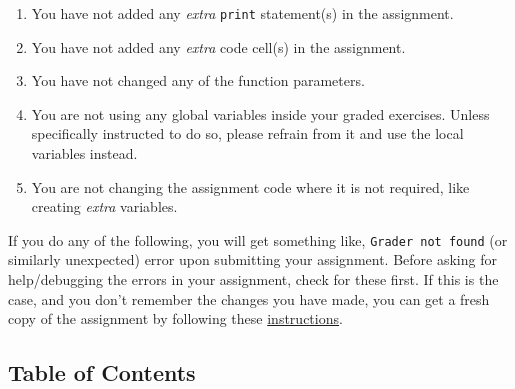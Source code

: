 \documentclass[11pt]{article}
\providecommand{\tightlist}{%
      \setlength{\itemsep}{0pt}\setlength{\parskip}{0pt}}
\begin{document}
\begin{enumerate}
\def\labelenumi{\arabic{enumi}.}
\tightlist
\item
  You have not added any \emph{extra} \texttt{print} statement(s) in the
  assignment.
\item
  You have not added any \emph{extra} code cell(s) in the assignment.
\item
  You have not changed any of the function parameters.
\item
  You are not using any global variables inside your graded exercises.
  Unless specifically instructed to do so, please refrain from it and
  use the local variables instead.
\item
  You are not changing the assignment code where it is not required,
  like creating \emph{extra} variables.
\end{enumerate}

If you do any of the following, you will get something like,
\texttt{Grader\ not\ found} (or similarly unexpected) error upon
submitting your assignment. Before asking for help/debugging the errors
in your assignment, check for these first. If this is the case, and you
don't remember the changes you have made, you can get a fresh copy of
the assignment by following these
\href{https://www.coursera.org/learn/deep-neural-network/supplement/QWEnZ/h-ow-to-refresh-your-workspace}{instructions}.

    \hypertarget{table-of-contents}{%
\subsection{Table of Contents}\label{table-of-contents}}
\end{document}
